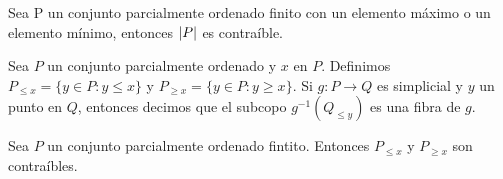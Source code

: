\begin{Col}
Sea P un conjunto parcialmente ordenado finito con un elemento máximo o un elemento mínimo, entonces $\left| P \right|$ es contraíble.
\end{Col}

\begin{Defi}
Sea $P$ un conjunto parcialmente ordenado y $x$ en $P$. Definimos $P_{\leqslant x} = \{y\in P : y\leqslant x\}$ y $P_{\geqslant x} = \{y\in P : y\geqslant x\}$. Si $g\colon P \rightarrow Q$ es simplicial y $y$ un punto en $Q$, entonces decimos que el subcopo $g^{-1}(Q_{\leqslant y})$ es una fibra de $g$.
\end{Defi}

\begin{Col}
Sea $P$ un conjunto parcialmente ordenado fintito. Entonces $P_{\leqslant x}$ y $P_{\geqslant x}$ son contraíbles.
\end{Col}

\begin{Teo}

\end{Teo}